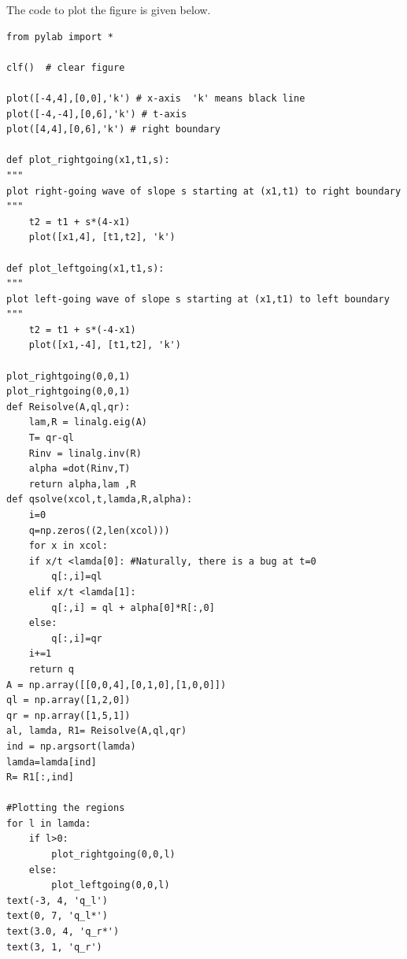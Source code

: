 \documentclass[11pt]{article}
\begin{document}
The code to plot the figure is given below.
\begin{lstlisting}[style=MyPythonstyle]
from pylab import *

clf()  # clear figure

plot([-4,4],[0,0],'k') # x-axis  'k' means black line
plot([-4,-4],[0,6],'k') # t-axis
plot([4,4],[0,6],'k') # right boundary

def plot_rightgoing(x1,t1,s):
"""
plot right-going wave of slope s starting at (x1,t1) to right boundary
"""
	t2 = t1 + s*(4-x1)
	plot([x1,4], [t1,t2], 'k')

def plot_leftgoing(x1,t1,s):
"""
plot left-going wave of slope s starting at (x1,t1) to left boundary
"""
	t2 = t1 + s*(-4-x1)
	plot([x1,-4], [t1,t2], 'k')

plot_rightgoing(0,0,1)
plot_rightgoing(0,0,1)
def Reisolve(A,ql,qr):
	lam,R = linalg.eig(A)
	T= qr-ql
	Rinv = linalg.inv(R)
	alpha =dot(Rinv,T)
	return alpha,lam ,R
def qsolve(xcol,t,lamda,R,alpha):
	i=0
	q=np.zeros((2,len(xcol)))
	for x in xcol:
	if x/t <lamda[0]: #Naturally, there is a bug at t=0
		q[:,i]=ql
	elif x/t <lamda[1]:
		q[:,i] = ql + alpha[0]*R[:,0]
	else:
		q[:,i]=qr
	i+=1
	return q
A = np.array([[0,0,4],[0,1,0],[1,0,0]])
ql = np.array([1,2,0])
qr = np.array([1,5,1])
al, lamda, R1= Reisolve(A,ql,qr)
ind = np.argsort(lamda)
lamda=lamda[ind]
R= R1[:,ind] 

#Plotting the regions
for l in lamda:
	if l>0:
		plot_rightgoing(0,0,l)
	else:
		plot_leftgoing(0,0,l)
text(-3, 4, 'q_l')
text(0, 7, 'q_l*')
text(3.0, 4, 'q_r*')
text(3, 1, 'q_r')
\end{lstlisting}
\end{document}
